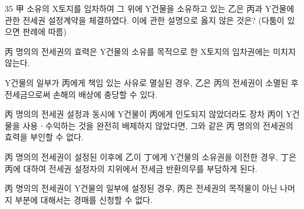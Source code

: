\begin{question}{35}
甲 소유의 X토지를 임차하여 그 위에 Y건물을 소유하고 있는 乙은 丙과 Y건물에 관한 전세권 설정계약을 체결하였다. 이에 관한 설명으로 옳지 않은 것은? (다툼이 있으면 판례에 따름)
\begin{choices}
  \item 丙 명의의 전세권의 효력은 Y건물의 소유를 목적으로 한 X토지의 임차권에는 미치지 않는다.
  \item Y건물의 일부가 丙에게 책임 있는 사유로 멸실된 경우, 乙은 丙의 전세권이 소멸된 후 전세금으로써 손해의 배상에 충당할 수 있다.
  \item 丙 명의의 전세권 설정과 동시에 Y건물이 丙에게 인도되지 않았더라도 장차 丙이 Y건물을 사용ㆍ수익하는 것을 완전히 배제하지 않았다면, 그와 같은 丙 명의의 전세권의 효력을 부인할 수 없다.
  \item 丙 명의의 전세권이 설정된 이후에 乙이 丁에게 Y건물의 소유권을 이전한 경우, 丁은 丙에 대하여 전세권 설정자의 지위에서 전세금 반환의무를 부담하게 된다.
  \item 丙 명의의 전세권이 Y건물의 일부에 설정된 경우, 丙은 전세권의 목적물이 아닌 나머지 부분에 대해서는 경매를 신청할 수 없다.
\end{choices}
\end{question}
